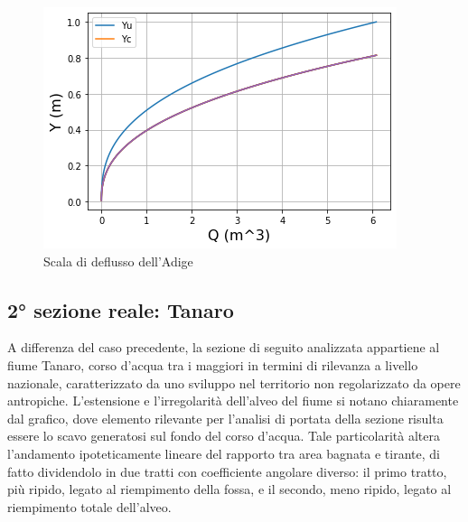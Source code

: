 \documentclass[12pt]{article} %
\begin{document}
\begin{figure} [H]
    \centering
    \includegraphics[scale=0.8]{deflussotri.png}
    \caption{Scala di deflusso dell'Adige}
    \label{fig:Adige_scala_deflusso}
\end{figure}

\subsection{2° sezione reale: Tanaro}

\noindent A differenza del caso precedente, la sezione di seguito analizzata appartiene al fiume Tanaro, corso d’acqua tra i maggiori in termini di rilevanza a livello nazionale, caratterizzato da uno sviluppo nel territorio non regolarizzato da opere antropiche.
L’estensione e l’irregolarità dell’alveo del fiume si notano chiaramente dal grafico, dove elemento rilevante per l’analisi di portata della sezione risulta essere lo scavo generatosi sul fondo del corso d’acqua. Tale particolarità altera l’andamento ipoteticamente lineare del rapporto tra area bagnata e tirante, di fatto dividendolo in due tratti con coefficiente angolare diverso: il primo tratto, più ripido, legato al riempimento della fossa, e il secondo, meno ripido, legato al riempimento totale dell’alveo.
\end{document}
